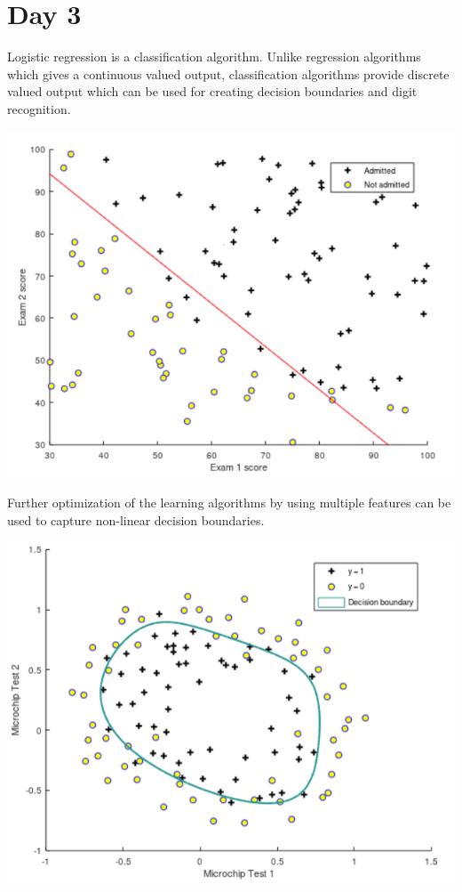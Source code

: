 \documentclass[11pt]{article}
\begin{document}
\section{Day 3}
Logistic regression is a classification algorithm. Unlike regression algorithms which gives a continuous valued output, classification algorithms provide discrete valued output which can be used for creating decision boundaries and digit recognition.\\ 
\begin{center}
\includegraphics[scale=.7]{img/simplifiedLogReg}
\end{center}
Further optimization of the learning algorithms by using multiple features can be used to capture non-linear decision boundaries.
\begin{center}
\includegraphics[scale=.7]{img/simplifiedRegLogReg.png}
\end{center}
\end{document}
